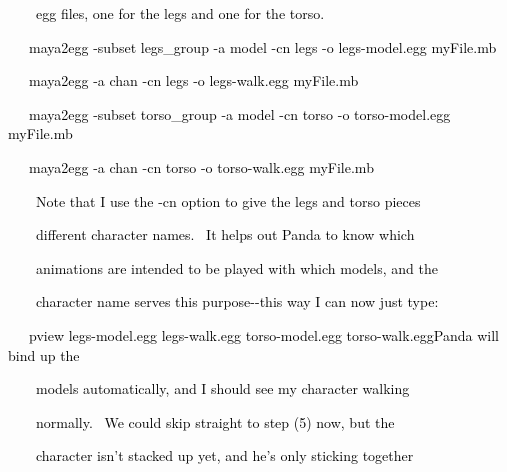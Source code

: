 \documentclass[a4paper]{article}
\newcommand\textstyleOOoComputerKeyWord[1]{\textrm{\textcolor[rgb]{0.0,0.0,0.5019608}{#1}}}
\begin{document}
{\color{black}
\textstyleOOoComputerKeyWord{\textcolor{black}{\ \ \ \ egg files, one for the legs and one for the torso.}}}


\bigskip

{\color{black}
\textstyleOOoComputerKeyWord{\textcolor{black}{\ \ \ maya2egg -subset legs\_group -a model -cn legs -o legs-model.egg
myFile.mb}}}

{\color{black}
\textstyleOOoComputerKeyWord{\textcolor{black}{\ \ \ maya2egg -a chan -cn legs -o legs-walk.egg myFile.mb}}}

{\color{black}
\textstyleOOoComputerKeyWord{\textcolor{black}{\ \ \ maya2egg -subset torso\_group -a model -cn torso -o torso-model.egg
myFile.mb}}}

{\color{black}
\textstyleOOoComputerKeyWord{\textcolor{black}{\ \ \ maya2egg -a chan -cn torso -o torso-walk.egg myFile.mb}}}


\bigskip

{\color{black}
\textstyleOOoComputerKeyWord{\textcolor{black}{\ \ \ \ Note that I use the -cn option to give the legs and torso
pieces}}}

{\color{black}
\textstyleOOoComputerKeyWord{\textcolor{black}{\ \ \ \ different character names. \ It helps out Panda to know which}}}

{\color{black}
\textstyleOOoComputerKeyWord{\textcolor{black}{\ \ \ \ animations are intended to be played with which models, and
the}}}

{\color{black}
\textstyleOOoComputerKeyWord{\textcolor{black}{\ \ \ \ character name serves this purpose-{}-this way I can now just
type:}}}


\bigskip

{\color{black}
\textstyleOOoComputerKeyWord{\textcolor{black}{\ \ \ pview legs-model.egg legs-walk.egg torso-model.egg
torso-walk.eggPanda will bind up the}}}

\clearpage{\color{black}
\textstyleOOoComputerKeyWord{\textcolor{black}{\ appropriate animations to their associated}}}

{\color{black}
\textstyleOOoComputerKeyWord{\textcolor{black}{\ \ \ \ models automatically, and I should see my character walking}}}

{\color{black}
\textstyleOOoComputerKeyWord{\textcolor{black}{\ \ \ \ normally. \ We could skip straight to step (5) now, but the}}}

{\color{black}
\textstyleOOoComputerKeyWord{\textcolor{black}{\ \ \ \ character isn't stacked up yet, and he's only sticking
together}}}
\end{document}
